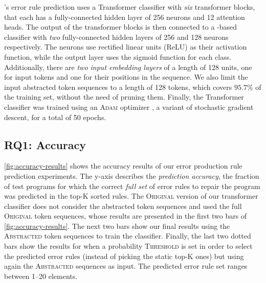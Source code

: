 \toolname's error rule prediction uses a Transformer classifier with \emph{six}
transformer blocks, that each has a fully-connected hidden layer of 256 neurons
and 12 attention heads. The output of the transformer blocks is then connected
to a \dnn-based classifier with \emph{two} fully-connected hidden layers of 256
and 128 neurons respectively. The neurons use rectified linear units (ReLU) as
their activation function, while the output layer uses the sigmoid function for
each class. Additionally, there are \emph{two input embedding layers} of a
length of 128 units, one for input tokens and one for their positions in the
sequence. We also limit the input abstracted token sequences to a length of 128
tokens, which covers $95.7\%$ of the training set, without the need of pruning
them. Finally, the Transformer classifier was trained using an \textsc{Adam}
optimizer \citep{Kingma2014-ng}, a variant of stochastic gradient descent, for a
total of 50 epochs.

\subsection{RQ1: Accuracy}
\label{sec:eval:accuracy}



%
\autoref{fig:accuracy-results} shows the accuracy results of our error
production rule prediction experiments. The y-axis describes the
\emph{prediction accuracy}, \ie the fraction of test programs for which the
correct \emph{full set} of error rules to repair the program was predicted in
the top-K sorted rules.
%
The \textsc{Original} version of our transformer classifier does not consider
the abstracted token sequences and used the full \textsc{Original} token
sequences, whose results are presented in the first two bars of
\autoref{fig:accuracy-results}. The next two bars show our final results using
the \textsc{Abstracted} token sequences to train the classifier. Finally, the
last two dotted bars show the results for when a probability \textsc{Threshold}
is set in order to select the predicted error rules (instead of picking the
static top-K ones) but using again the \textsc{Abstracted} sequences as input.
The predicted error rule set ranges between 1--20 elements.

